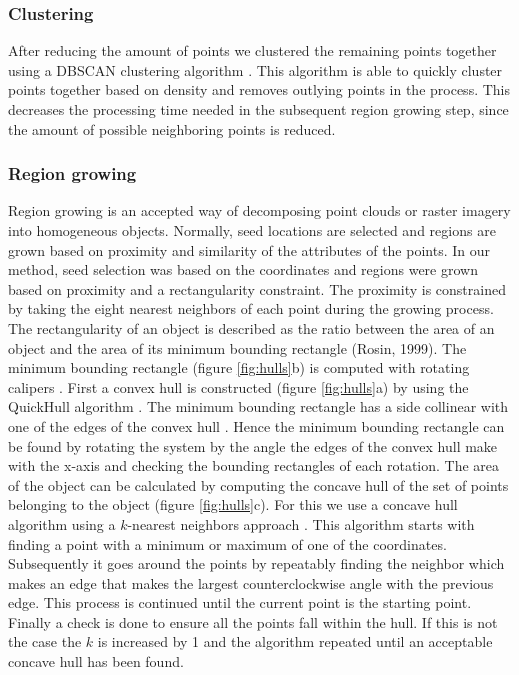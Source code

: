 \subsubsection{Clustering}
After reducing the amount of points we clustered the remaining points together using a DBSCAN clustering algorithm \citep{ester1996density}. This algorithm is able to quickly cluster points together based on density and removes outlying points in the process. This decreases the processing time needed in the subsequent region growing step, since the amount of possible neighboring points is reduced.

\subsubsection{Region growing}
Region growing is an accepted way of decomposing point clouds \citep{rabbani2006segmentation, vosselman2013point} or raster imagery \citep{blaschke2014geographic} into homogeneous objects. Normally, seed locations are selected and regions are grown based on proximity and similarity of the attributes of the points. In our method, seed selection was based on the coordinates and regions were grown based on proximity and a rectangularity constraint. The proximity is constrained by taking the eight nearest neighbors of each point during the growing process. The rectangularity of an object is described as the ratio between the area of an object and the area of its minimum bounding rectangle (Rosin, 1999). The minimum bounding rectangle (figure \ref{fig:hulls}b) is computed with rotating calipers \citep{toussaint1983solving}. First a convex hull is constructed (figure \ref{fig:hulls}a) by using the QuickHull algorithm \citep{preparata1985computational}. The minimum bounding rectangle has a side collinear with one of the edges of the convex hull \citep{freeman1975determining}. Hence the minimum bounding rectangle can be found by rotating the system by the angle the edges of the convex hull make with the x-axis and checking the bounding rectangles of each rotation. The area of the object can be calculated by computing the concave hull of the set of points belonging to the object (figure \ref{fig:hulls}c). For this we use a concave hull algorithm using a \(k\)-nearest neighbors approach \citep{moreira2007concave}. This algorithm starts with finding a point with a minimum or maximum of one of the coordinates. Subsequently it goes around the points by repeatably finding the neighbor which makes an edge that makes the largest counterclockwise angle with the previous edge. This process is continued until the current point is the starting point. Finally a check is done to ensure all the points fall within the hull. If this is not the case the \(k\) is increased by 1 and the algorithm repeated until an acceptable concave hull has been found.

